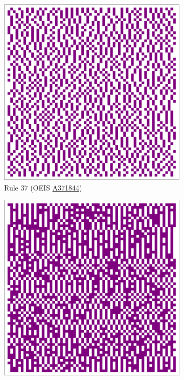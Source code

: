 \documentclass{article}
\begin{document}
\begin{figure}[H]
    \centering
    \begin{subfigure}[b]{0.49\textwidth}
        \centering
        \includegraphics[width=.8\textwidth]{graphics/behavior/center-columns/rule-37-center_column_plot-4096.pdf}
        \caption{Rule 37 (OEIS \href{https://oeis.org/A371844}{A371844})}
        \label{fig:rule-37-center_column_plot-4096}
    \end{subfigure}
    \vspace{16pt}
    \begin{subfigure}[b]{0.49\textwidth}
        \centering
        \includegraphics[width=.8\textwidth]{graphics/behavior/center-columns/rule-61-center_column_plot-4096.pdf}

\end{subfigure}
\end{figure}
\end{document}
